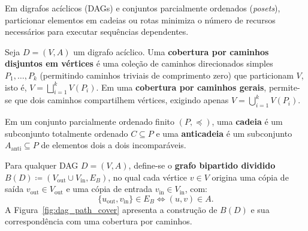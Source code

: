 Em digrafos acíclicos (DAGs) e conjuntos parcialmente ordenados (\textit{posets}), particionar elementos em cadeias ou rotas minimiza o número de recursos necessários para executar sequências dependentes.

\begin{definicao}
Seja $D = (V, A)$ um digrafo acíclico. Uma \textbf{cobertura por caminhos disjuntos em vértices} é uma coleção de caminhos direcionados simples $P_1, \dots, P_k$ (permitindo caminhos triviais de comprimento zero) que particionam $V$, isto é, $V = \bigsqcup_{i=1}^k V(P_i)$. Em uma \textbf{cobertura por caminhos gerais}, permite-se que dois caminhos compartilhem vértices, exigindo apenas $V = \bigcup_{i=1}^k V(P_i)$.

Em um conjunto parcialmente ordenado finito $(P, \preceq)$, uma \textbf{cadeia} é um subconjunto totalmente ordenado $C \subseteq P$ e uma \textbf{anticadeia} é um subconjunto $A_{\text{anti}} \subseteq P$ de elementos dois a dois incomparáveis.
\end{definicao}

Para qualquer DAG $D = (V, A)$, define-se o \textbf{grafo bipartido dividido} $B(D) \coloneqq (V_{\text{out}} \cup V_{\text{in}}, E_B)$, no qual cada vértice $v \in V$ origina uma cópia de saída $v_{\text{out}} \in V_{\text{out}}$ e uma cópia de entrada $v_{\text{in}} \in V_{\text{in}}$, com:
\begin{equation}
    \{u_{\text{out}}, v_{\text{in}}\} \in E_B \iff (u, v) \in A.
\end{equation}
A Figura~\ref{fig:dag_path_cover} apresenta a construção de $B(D)$ e sua correspondência com uma cobertura por caminhos.

